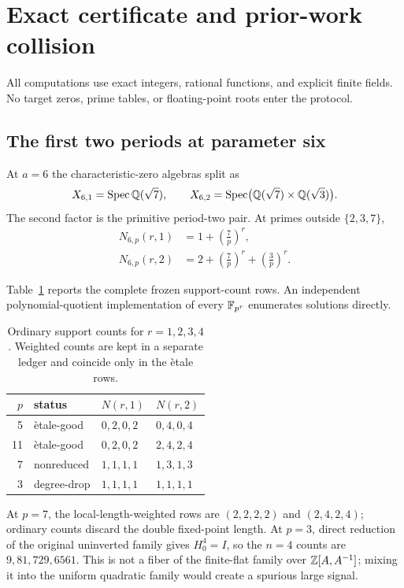 \section{Exact certificate and prior-work collision}\label{sec:certificate}

All computations use exact integers, rational functions, and explicit finite
fields.  No target zeros, prime tables, or floating-point roots enter the
protocol.

\subsection{The first two periods at parameter six}

At $a=6$ the characteristic-zero algebras split as
\[
 X_{6,1}=\operatorname{Spec}\mathbb Q(\sqrt7),\qquad
 X_{6,2}=\operatorname{Spec}\bigl(\mathbb Q(\sqrt7)\times\mathbb Q(\sqrt3)\bigr).
\]
The second factor is the primitive period-two pair.  At primes outside
$\{2,3,7\}$,
\begin{align}
 N_{6,p}(r,1)&=1+\left(\frac7p\right)^r,\label{eq:n1}\\
 N_{6,p}(r,2)&=2+\left(\frac7p\right)^r
                  +\left(\frac3p\right)^r.\label{eq:n2}
\end{align}

Table~\ref{tab:counts} reports the complete frozen support-count rows.  An
independent polynomial-quotient implementation of every $\mathbb F_{p^r}$ enumerates
solutions directly.

\begin{table}[ht]
\centering
\caption{Ordinary support counts for $r=1,2,3,4$.  Weighted counts are kept in
a separate ledger and coincide only in the \`etale rows.}\label{tab:counts}
\begin{tabular}{rlll}
\toprule
$p$ & status & $N(r,1)$ & $N(r,2)$\\
\midrule
5  & \`etale-good & $0,2,0,2$ & $0,4,0,4$\\
11 & \`etale-good & $0,2,0,2$ & $2,4,2,4$\\
7  & nonreduced   & $1,1,1,1$ & $1,3,1,3$\\
3  & degree-drop  & $1,1,1,1$ & $1,1,1,1$\\
\bottomrule
\end{tabular}
\end{table}

At $p=7$, the local-length-weighted rows are $(2,2,2,2)$ and $(2,4,2,4)$;
ordinary counts discard the double fixed-point length.  At $p=3$, direct
reduction of the original uninverted family gives $H_0^4=I$, so the $n=4$
counts are $9,81,729,6561$.  This is not a fiber of the finite-flat family
over $\mathbb Z[A,A^{-1}]$; mixing it into the uniform quadratic family would create
a spurious large signal.

